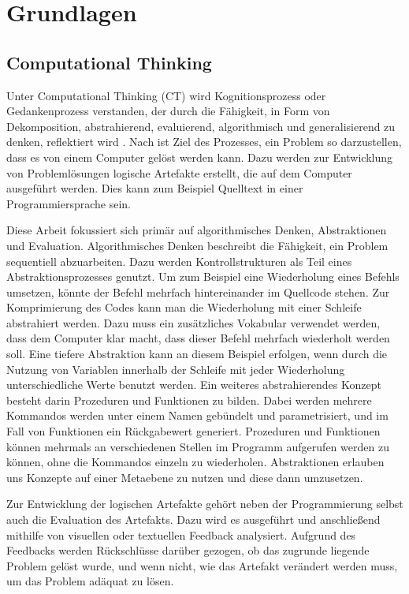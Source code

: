 \chapter{Grundlagen}

\section{Computational Thinking}

Unter Computational Thinking (CT) wird Kognitionsprozess oder Gedankenprozess verstanden, der durch
die Fähigkeit, in Form von Dekomposition, abstrahierend, evaluierend, algorithmisch und
generalisierend zu denken, reflektiert wird \cite{selby_computational}. Nach \cite{wing2011research}
ist Ziel des Prozesses, ein Problem so darzustellen, dass es von einem Computer gelöst werden kann.  
Dazu werden zur Entwicklung von Problemlösungen logische Artefakte erstellt, die auf dem Computer
ausgeführt werden. Dies kann zum Beispiel Quelltext in einer Programmiersprache sein.

Diese Arbeit fokussiert sich primär auf algorithmisches Denken, Abstraktionen und Evaluation.
Algorithmisches Denken beschreibt die Fähigkeit, ein Problem sequentiell abzuarbeiten. Dazu werden
Kontrollstrukturen als Teil eines Abstraktionsprozesses genutzt. Um zum Beispiel eine Wiederholung
eines Befehls umsetzen, könnte der Befehl mehrfach hintereinander im Quellcode stehen. Zur
Komprimierung des Codes kann man die Wiederholung mit einer Schleife abstrahiert werden. Dazu muss
ein zusätzliches Vokabular verwendet werden, dass dem Computer klar macht, dass dieser Befehl
mehrfach wiederholt werden soll. Eine tiefere Abstraktion kann an diesem Beispiel erfolgen, wenn
durch die Nutzung von Variablen innerhalb der Schleife mit jeder Wiederholung unterschiedliche Werte
benutzt werden. Ein weiteres abstrahierendes Konzept besteht darin Prozeduren und Funktionen zu
bilden. Dabei werden mehrere Kommandos werden unter einem Namen gebündelt und parametrisiert, und im
Fall von Funktionen ein Rückgabewert generiert. Prozeduren und Funktionen können mehrmals an
verschiedenen Stellen im Programm aufgerufen werden zu können, ohne die Kommandos einzeln zu
wiederholen. Abstraktionen erlauben uns Konzepte auf einer Metaebene zu nutzen und diese dann
umzusetzen.

Zur Entwicklung der logischen Artefakte gehört neben der Programmierung selbst auch die Evaluation
des Artefakts. Dazu wird es ausgeführt und anschließend mithilfe von visuellen oder textuellen
Feedback analysiert. Aufgrund des Feedbacks werden Rückschlüsse darüber gezogen, ob das zugrunde
liegende Problem gelöst wurde, und wenn nicht, wie das Artefakt verändert werden muss, um das
Problem adäquat zu lösen.

